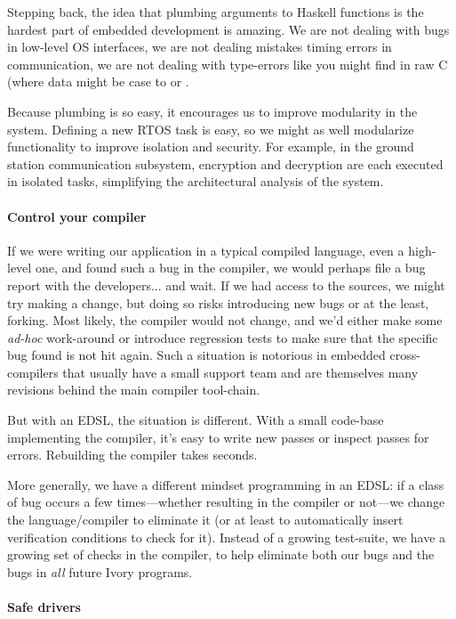 Stepping back, the idea that plumbing arguments to Haskell functions is the
hardest part of embedded development is amazing.  We are not dealing with bugs
in low-level OS interfaces, we are not dealing mistakes timing errors in
communication, we are not dealing with type-errors like you might find in raw C
(where data might be case to  or .

Because plumbing is so easy, it encourages us to improve modularity in the
system.  Defining a new RTOS task is easy, so we might as well modularize
functionality to improve isolation and security.  For example, in the ground
station communication subsystem, encryption and decryption are each executed in
isolated tasks, simplifying the architectural analysis of the system.

\paragraph{Control your compiler}
If we were writing our application in a typical compiled language, even a
high-level one, and found such a bug in the compiler, we would perhaps file a
bug report with the developers... and wait.  If we had access to the sources, we
might try making a change, but doing so risks introducing new bugs or at the
least, forking.  Most likely, the compiler would not change, and we’d either
make some \emph{ad-hoc} work-around or introduce regression tests to make sure
that the specific bug found is not hit again.  Such a situation is notorious in
embedded cross-compilers that usually have a small support team and are
themselves many revisions behind the main compiler tool-chain.

But with an EDSL, the situation is different.  With a small code-base
implementing the compiler, it’s easy to write new passes or inspect passes for
errors.  Rebuilding the compiler takes seconds.

More generally, we have a different mindset programming in an EDSL: if a class
of bug occurs a few times---whether resulting in the compiler or not---we change
the language/compiler to eliminate it (or at least to automatically insert
verification conditions to check for it).  Instead of a growing test-suite, we
have a growing set of checks in the compiler, to help eliminate both our bugs
and the bugs in \emph{all} future Ivory programs.

\paragraph{Safe drivers}









